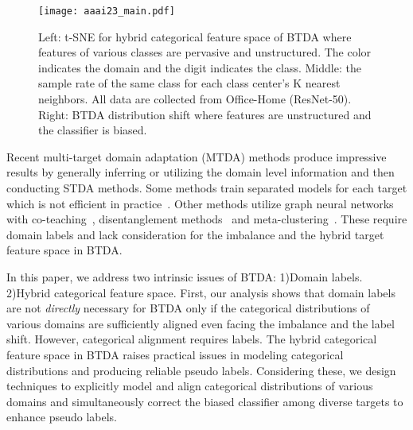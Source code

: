 \documentclass[letterpaper]{article} \usepackage{aaai23}  \usepackage{times}  \usepackage{helvet}  \usepackage{courier}  \usepackage[hyphens]{url}  \usepackage{graphicx} \urlstyle{rm} \def\UrlFont{\rm}  \usepackage{natbib}  \usepackage{caption} \frenchspacing  \setlength{\pdfpagewidth}{8.5in}  \setlength{\pdfpageheight}{11in}
\begin{document}
\begin{figure*}[t] \centering \texttt{[image: aaai23\_main.pdf]} \caption{Left: t-SNE for hybrid categorical feature space of BTDA where features of various classes are pervasive and unstructured. The color indicates the domain and the digit indicates the class. Middle: the sample rate of the same class for each class center's K nearest neighbors. All data are collected from Office-Home (ResNet-50). Right: BTDA distribution shift where features are unstructured and the classifier is biased.} 
\label{btda_hybrid_feat} \end{figure*}

Recent multi-target domain adaptation (MTDA) methods produce impressive results by generally inferring or utilizing the domain level information and then conducting STDA methods. Some methods train separated models for each target which is not efficient in practice~\cite{saporta2021multi,isobe2021multi,nguyen2021unsupervised,saporta2021multi}. Other methods utilize graph neural networks with co-teaching~\cite{roy2021curriculum}, disentanglement methods~\cite{gholami2020unsupervised} and meta-clustering~\cite{chen2019blending}. These require domain labels and lack consideration for the imbalance and the hybrid target feature space in BTDA.

In this paper, we address two intrinsic issues of BTDA: 1)Domain labels. 2)Hybrid categorical feature space. First, our analysis shows that domain labels are not \textit{directly} necessary for BTDA only if the categorical distributions of various domains are sufficiently aligned even facing the imbalance and the label shift. However, categorical alignment requires labels. The hybrid categorical feature space in BTDA raises practical issues in modeling categorical distributions and producing reliable pseudo labels. Considering these, we design techniques to explicitly model and align categorical distributions  of various domains and simultaneously correct the biased classifier  among diverse targets to enhance pseudo labels.
\end{document}
